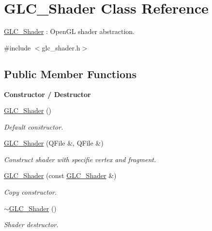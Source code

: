 \hypertarget{class_g_l_c___shader}{\section{G\-L\-C\-\_\-\-Shader Class Reference}
\label{class_g_l_c___shader}
}


\hyperlink{class_g_l_c___shader}{G\-L\-C\-\_\-\-Shader} \-: Open\-G\-L shader abstraction.  




{\ttfamily \#include $<$glc\-\_\-shader.\-h$>$}

\subsection*{Public Member Functions}
\begin{Indent}{\bf Constructor / Destructor}\par
\begin{DoxyCompactItemize}
\item 
\hyperlink{class_g_l_c___shader_ae922efe733d0ff84475d1a5c7c375098}{G\-L\-C\-\_\-\-Shader} ()
\begin{DoxyCompactList}\small\item\em Default constructor. \end{DoxyCompactList}\item 
\hyperlink{class_g_l_c___shader_ad4f55e40a1ca63c77e0d27fffb519e56}{G\-L\-C\-\_\-\-Shader} (Q\-File \&, Q\-File \&)
\begin{DoxyCompactList}\small\item\em Construct shader with specifie vertex and fragment. \end{DoxyCompactList}\item 
\hyperlink{class_g_l_c___shader_aa402e7bf83513675c97655ddf269273b}{G\-L\-C\-\_\-\-Shader} (const \hyperlink{class_g_l_c___shader}{G\-L\-C\-\_\-\-Shader} \&)
\begin{DoxyCompactList}\small\item\em Copy constructor. \end{DoxyCompactList}\item 
\hyperlink{class_g_l_c___shader_a18d1d97fbf269c9d3396e8ff2ee4498f}{$\sim$\-G\-L\-C\-\_\-\-Shader} ()
\begin{DoxyCompactList}\small\item\em Shader destructor. \end{DoxyCompactList}\end{DoxyCompactItemize}
\end{Indent}
